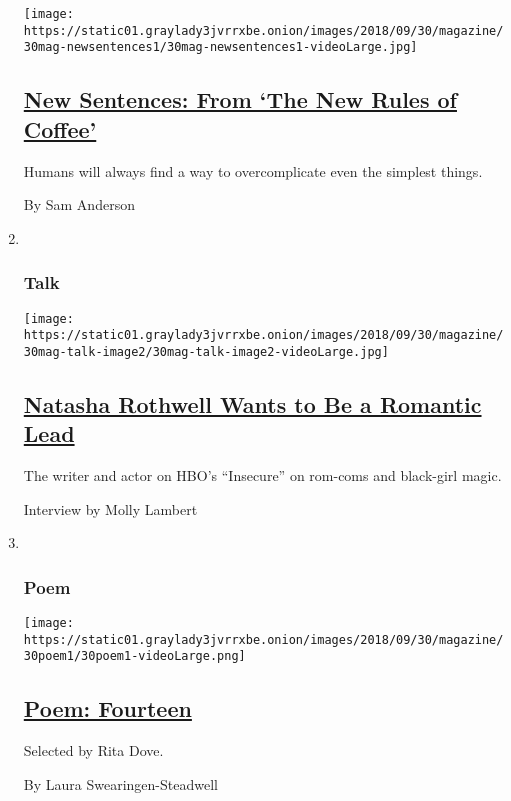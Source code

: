 \begin{enumerate}
  \texttt{[image: https://static01.graylady3jvrrxbe.onion/images/2018/09/30/magazine/30mag-newsentences1/30mag-newsentences1-videoLarge.jpg]}

  \hypertarget{new-sentences-from-the-new-rules-of-coffee}{%
  \subsection{\texorpdfstring{\href{/2018/09/27/magazine/new-sentences-from-the-new-rules-of-coffee.html}{New
  Sentences: From `The New Rules of
  Coffee'}}{New Sentences: From `The New Rules of Coffee'}}\label{new-sentences-from-the-new-rules-of-coffee}}

  Humans will always find a way to overcomplicate even the simplest
  things.

  By Sam Anderson
\item ~
  \hypertarget{talk}{%
  \subsubsection{Talk}\label{talk}}

  \texttt{[image: https://static01.graylady3jvrrxbe.onion/images/2018/09/30/magazine/30mag-talk-image2/30mag-talk-image2-videoLarge.jpg]}

  \hypertarget{natasha-rothwell-wants-to-be-a-romantic-lead}{%
  \subsection{\texorpdfstring{\href{/2018/09/26/magazine/natasha-rothwell-wants-to-be-a-romantic-lead.html}{Natasha
  Rothwell Wants to Be a Romantic
  Lead}}{Natasha Rothwell Wants to Be a Romantic Lead}}\label{natasha-rothwell-wants-to-be-a-romantic-lead}}

  The writer and actor on HBO's ``Insecure'' on rom-coms and black-girl
  magic.

  Interview by Molly Lambert
\item ~
  \hypertarget{poem}{%
  \subsubsection{Poem}\label{poem}}

  \texttt{[image: https://static01.graylady3jvrrxbe.onion/images/2018/09/30/magazine/30poem1/30poem1-videoLarge.png]}

  \hypertarget{poem-fourteen}{%
  \subsection{\texorpdfstring{\href{/2018/09/27/magazine/poem-fourteen.html}{Poem:
  Fourteen}}{Poem: Fourteen}}\label{poem-fourteen}}

  Selected by Rita Dove.

  By Laura Swearingen-Steadwell
\end{enumerate}

